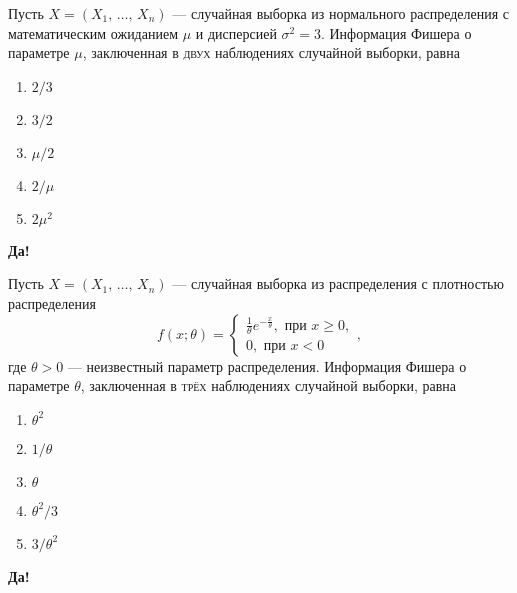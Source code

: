 \documentclass[t]{beamer}
\begin{document}
 \begin{frame} \label{23-Yes} 
\begin{block}{23} 

  Пусть $X = (X_1, \, \ldots, \, X_n)$ — случайная выборка из нормального распределения с математическим ожиданием $\mu$ и дисперсией $\sigma^2 = 3$. Информация Фишера о параметре $\mu$, заключенная в \textsc{двух} наблюдениях случайной выборки, равна


 \end{block} 
\begin{enumerate} 
\item[] \hyperlink{23-Yes}{\beamergotobutton{} $2 / 3$}
\item[] \hyperlink{23-No}{\beamergotobutton{} $3 / 2$}
\item[] \hyperlink{23-No}{\beamergotobutton{} $\mu / 2$}
\item[] \hyperlink{23-No}{\beamergotobutton{} $2 / \mu$}
\item[] \hyperlink{23-No}{\beamergotobutton{} $2 \mu^2$}
\end{enumerate} 

 \textbf{Да!} 
 \hyperlink{24}{}\end{frame} 


 \begin{frame} \label{24-Yes} 
\begin{block}{24} 

    Пусть $X = (X_1, \, \ldots, \, X_n)$ — случайная выборка из распределения с плотностью распределения
  \[
      f(x; \theta) =
      \begin{cases}
          \frac{1}{\theta} e^{-\frac{x}{\theta}}, \text{ при } x \geq 0, \\
          0, \text{ при } x < 0
      \end{cases},
  \]
  где $\theta > 0$ — неизвестный параметр распределения. Информация Фишера о параметре $\theta$, заключенная в \textsc{трёх} наблюдениях случайной выборки, равна


 \end{block} 
\begin{enumerate} 
\item[] \hyperlink{24-No}{\beamergotobutton{} $\theta^2$}
\item[] \hyperlink{24-No}{\beamergotobutton{} $1 / \theta$}
\item[] \hyperlink{24-No}{\beamergotobutton{} $\theta$}
\item[] \hyperlink{24-No}{\beamergotobutton{} $\theta^2 / 3$}
\item[] \hyperlink{24-Yes}{\beamergotobutton{} $3 / \theta^2$}
\end{enumerate} 

 \textbf{Да!} 
 \hyperlink{25}{}\end{frame} 
\end{document}
